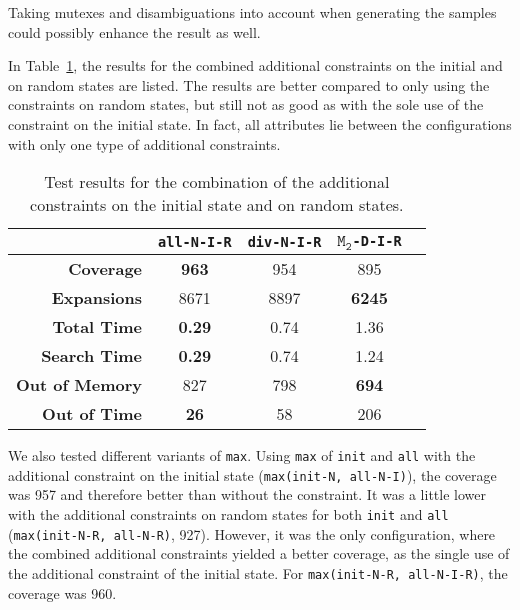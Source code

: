 Taking mutexes and disambiguations into account when generating the samples could possibly enhance the result as well.

In Table~\ref{table:initial-random-samples-constraint}, the results for the combined additional constraints on the initial and on random states are listed.
The results are better compared to only using the constraints on random states, but still not as good as with the sole use of the constraint on the initial state.
In fact, all attributes lie between the configurations with only one type of additional constraints.

\begin{table}[h!]
    \begin{center}
        \begin{tabular}{|r|c|c|c|c|}
            \hline
            & \textbf{\texttt{all-N-I-R}} & \textbf{\texttt{div-N-I-R}} & \textbf{$\texttt{M}_\texttt{2}$\texttt{-D-I-R}} \\
            \hline \hline
            \textbf{Coverage}       & \textbf{963}  & 954  & 895   \\ \hline
            \textbf{Expansions}     & 8671          & 8897 & \textbf{6245}   \\ \hline
            \textbf{Total Time}     & \textbf{0.29} & 0.74 & 1.36  \\ \hline
            \textbf{Search Time}    & \textbf{0.29} & 0.74 & 1.24  \\ \hline
            \textbf{Out of Memory}  & 827           & 798  & \textbf{694}   \\ \hline
            \textbf{Out of Time}    & \textbf{26}   & 58   & 206   \\ \hline
        \end{tabular}
        \caption{ Test results for the combination of the additional constraints on the initial state and on random states.}
        \label{table:initial-random-samples-constraint}
    \end{center}
\end{table}

We also tested different variants of \texttt{max}.
Using \texttt{max} of \texttt{init} and \texttt{all} with the additional constraint on the initial state (\texttt{max(init-N, all-N-I)}), the coverage was 957 and therefore better than without the constraint.
It was a little lower with the additional constraints on random states for both \texttt{init} and \texttt{all} (\texttt{max(init-N-R, all-N-R)}, 927).
However, it was the only configuration, where the combined additional constraints yielded a better coverage, as the single use of the additional constraint of the initial state.
For \texttt{max(init-N-R, all-N-I-R)}, the coverage was 960.

